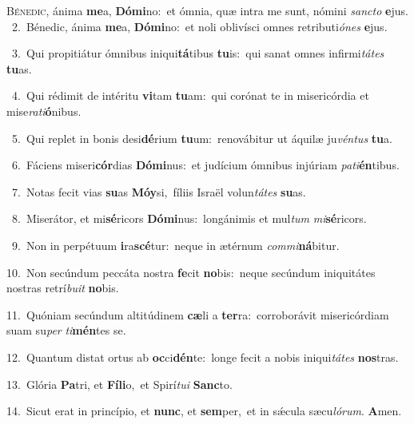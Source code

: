 \lettrine{\initial\textcolor{\initialcolor}{B}}{énedic,} ánima \textbf{me}\-a, \textbf{Dó}\-\textbf{mi}no:~\star et ómnia, quæ intra me sunt, nómini \textit{sanc}\-\textit{to} \textbf{e}\-jus.\\
{\numbfont\textcolor{\numbcolor}{~2.}}~Bénedic, ánima \textbf{me}\-a, \textbf{Dó}\-\textbf{mi}no:~\star et noli oblivísci omnes retributi\-\textit{ó}\-\textit{nes} \textbf{e}\-jus.\par
{\numbfont\textcolor{\numbcolor}{~3.}}~Qui propitiátur ómnibus iniqui\-\textbf{tá}\-tibus \textbf{tu}\-is:~\star qui sanat omnes infirmi\-\textit{tá}\-\textit{tes} \textbf{tu}\-as.\par
{\numbfont\textcolor{\numbcolor}{~4.}}~Qui rédimit de intéritu \textbf{vi}\-tam \textbf{tu}\-am:~\star qui corónat te in misericórdia et mise\-\textit{ra}\-\textit{ti}\textbf{ó}nibus.\par
{\numbfont\textcolor{\numbcolor}{~5.}}~Qui replet in bonis desi\-\textbf{dé}\-rium \textbf{tu}\-um:~\star renovábitur ut áquilæ ju\-\textit{vén}\-\textit{tus} \textbf{tu}\-a.\par
{\numbfont\textcolor{\numbcolor}{~6.}}~Fáciens miseri\-\textbf{cór}\-dias \textbf{Dó}\-\textbf{mi}nus:~\star et judícium ómnibus injúriam \textit{pa}\-\textit{ti}\textbf{én}tibus.\par
{\numbfont\textcolor{\numbcolor}{~7.}}~Notas fecit vias \textbf{su}\-as \textbf{Mó}\-\textbf{y}si,~\star fíliis Israël volun\-\textit{tá}\-\textit{tes} \textbf{su}\-as.\par
{\numbfont\textcolor{\numbcolor}{~8.}}~Miserátor, et mi\-\textbf{sé}\-ricors \textbf{Dó}\-\textbf{mi}nus:~\star longánimis et mul\textit{tum} \textit{mi}\-\textbf{sé}ricors.\par
{\numbfont\textcolor{\numbcolor}{~9.}}~Non in perpétuum \textbf{i}\-ra\-\textbf{scé}\-tur:~\star neque in ætérnum \textit{com}\-\textit{mi}\textbf{ná}bitur.\par
{\numbfont\textcolor{\numbcolor}{10.}}~Non secúndum peccáta nostra \textbf{fe}\-cit \textbf{no}\-bis:~\star neque secúndum iniquitátes nostras retrí\-\textit{bu}\-\textit{it} \textbf{no}\-bis.\par
{\numbfont\textcolor{\numbcolor}{11.}}~Quóniam secúndum altitúdinem \textbf{cæ}\-li a \textbf{ter}\-ra:~\star corroborávit misericórdiam suam su\textit{per} \textit{ti}\-\textbf{mén}tes se.\par
{\numbfont\textcolor{\numbcolor}{12.}}~Quantum distat ortus ab \textbf{oc}\-ci\-\textbf{dén}\-te:~\star longe fecit a nobis iniqui\-\textit{tá}\-\textit{tes} \textbf{nos}\-tras.\par
{\numbfont\textcolor{\numbcolor}{13.}}~Glória \textbf{Pa}\-tri, et \textbf{Fí}\-\textbf{li}o,~\star et Spirí\-\textit{tu}\-\textit{i} \textbf{Sanc}\-to.\par
{\numbfont\textcolor{\numbcolor}{14.}}~Sicut erat in princípio, et \textbf{nunc}\-, et \textbf{sem}\-per,~\star et in sǽcula sæcu\-\textit{ló}\-\textit{rum}. \textbf{A}\-men.\par
